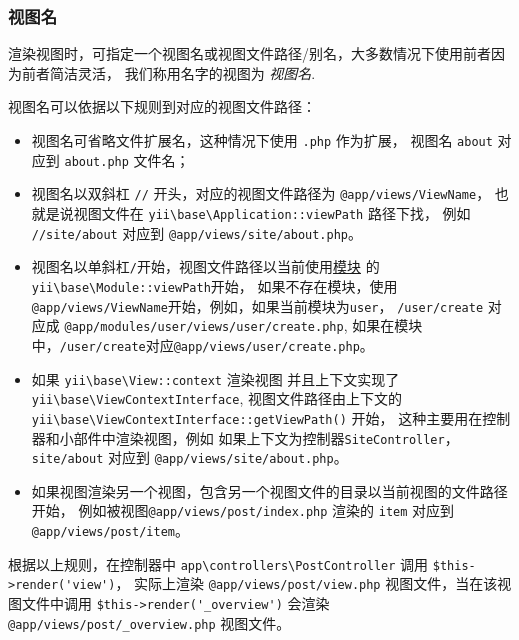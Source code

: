 \subsubsection{视图名 \label{structure-views.md::named-views}}
渲染视图时，可指定一个视图名或视图文件路径/别名，大多数情况下使用前者因为前者简洁灵活，
我们称用名字的视图为 \textit{视图名}.

视图名可以依据以下规则到对应的视图文件路径：

\begin{itemize}
\item 视图名可省略文件扩展名，这种情况下使用 \lstinline|.php| 作为扩展，
视图名 \lstinline|about| 对应到 \lstinline|about.php| 文件名；
\item 视图名以双斜杠 \lstinline|//| 开头，对应的视图文件路径为 \lstinline|@app/views/ViewName|，
也就是说视图文件在 \texttt{yii{\allowbreak{}\textbackslash}base{\allowbreak{}\textbackslash}Application\allowbreak{}::\allowbreak{}viewPath} 路径下找，
例如 \lstinline|//site/about| 对应到 \lstinline|@app/views/site/about.php|。
\item 视图名以单斜杠\lstinline|/|开始，视图文件路径以当前使用\hyperref[structure-modules.md]{模块} 的\texttt{yii{\allowbreak{}\textbackslash}base{\allowbreak{}\textbackslash}Module\allowbreak{}::\allowbreak{}viewPath}开始，
如果不存在模块，使用\lstinline|@app/views/ViewName|开始，例如，如果当前模块为\lstinline|user|， \lstinline|/user/create| 对应成
\lstinline|@app/modules/user/views/user/create.php|, 如果在模块中，\lstinline|/user/create|对应\lstinline|@app/views/user/create.php|。
\item 如果 \texttt{yii{\allowbreak{}\textbackslash}base{\allowbreak{}\textbackslash}View\allowbreak{}::\allowbreak{}context} 渲染视图 并且上下文实现了 \texttt{yii{\allowbreak{}\textbackslash}base{\allowbreak{}\textbackslash}ViewContextInterface},
视图文件路径由上下文的 \texttt{yii{\allowbreak{}\textbackslash}base{\allowbreak{}\textbackslash}ViewContextInterface\allowbreak{}::\allowbreak{}getViewPath()} 开始，
这种主要用在控制器和小部件中渲染视图，例如
如果上下文为控制器\lstinline|SiteController|，\lstinline|site/about| 对应到 \lstinline|@app/views/site/about.php|。
\item 如果视图渲染另一个视图，包含另一个视图文件的目录以当前视图的文件路径开始，
例如被视图\lstinline|@app/views/post/index.php| 渲染的 \lstinline|item| 对应到 \lstinline|@app/views/post/item|。
\end{itemize}
根据以上规则，在控制器中 \lstinline|app\controllers\PostController| 调用 \lstinline|$this->render('view')|，
实际上渲染 \lstinline|@app/views/post/view.php| 视图文件，当在该视图文件中调用 \lstinline|$this->render('_overview')|
会渲染 \lstinline|@app/views/post/_overview.php| 视图文件。

